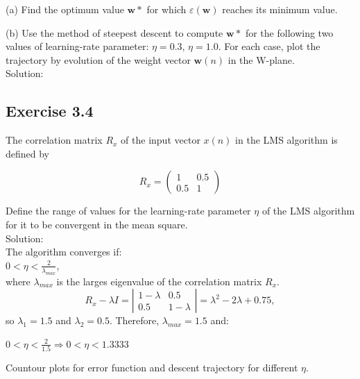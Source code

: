 \documentclass[a4paper, 12pt]{article}
\begin{document}
(a) Find the optimum value $\boldsymbol{w}*$ for which $\varepsilon(\boldsymbol{w})$ reaches its minimum value.

(b) Use the method of steepest descent to compute $\boldsymbol{w}*$ for the following two values of learning-rate parameter: $\eta = 0.3$, $\eta = 1.0$. For each case, plot the trajectory by evolution of the weight vector $\boldsymbol{w}(n)$ in the W-plane.\\

Solution:\\


\subsection{Exercise 3.4}
The correlation matrix $R_x$ of the input vector $x(n)$ in the LMS algorithm is defined by

\[ R_x = \left( \begin{array}{ccc}
1 & 0.5 \\
0.5  & 1 \end{array} \right)\]

Define the range of values for the learning-rate parameter $\eta$ of the LMS algorithm for it to be convergent in the mean square.\\

Solution:\\

The algorithm converges if:\\

$0 < \eta < \frac{2}{\lambda_{max}}$,\\
where $\lambda_{max}$ is the larges eigenvalue of the correlation matrix $R_x$.\\

 \[ R_x - \lambda I = \left| \begin{array}{ccc}
1 - \lambda & 0.5 \\
0.5 & 1 - \lambda \end{array} \right| = \lambda^2 - 2\lambda + 0.75,\]
so $\lambda_1 = 1.5$ and $\lambda_2 = 0.5$. Therefore, $\lambda_{max} = 1.5$ and:

$0 < \eta < \frac{2}{1.5} \Rightarrow 0 < \eta < 1.3333$

\smallskip
Countour plots for error function and descent trajectory for different $\eta$.
\end{document}
